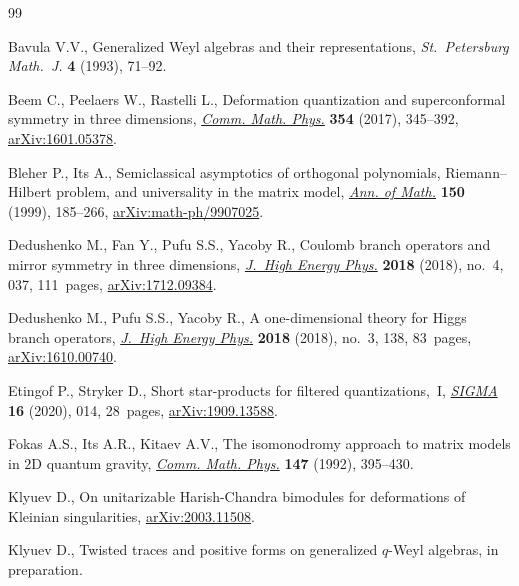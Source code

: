 \documentclass[pdftex]{sigma}
\theoremstyle{definition}
\numberwithin{equation}{section}
\begin{document}
\begin{thebibliography}{99}
\footnotesize\itemsep=0pt

Bavula V.V., Generalized {W}eyl algebras and their representations,
 \textit{St.~Petersburg Math.~J.} \textbf{4} (1993), 71--92.

Beem C., Peelaers W., Rastelli L., Deformation quantization and superconformal
 symmetry in three dimensions, \href{https://doi.org/10.1007/s00220-017-2845-6}{\textit{Comm. Math. Phys.}} \textbf{354} (2017),
 345--392, \href{https://arxiv.org/abs/1601.05378}{arXiv:1601.05378}.

Bleher P., Its A., Semiclassical asymptotics of orthogonal polynomials,
 {R}iemann--{H}ilbert problem, and universality in the matrix model,
 \href{https://doi.org/10.2307/121101}{\textit{Ann. of Math.}} \textbf{150} (1999), 185--266,
 \href{https://arxiv.org/abs/math-ph/9907025}{arXiv:math-ph/9907025}.

Dedushenko M., Fan Y., Pufu S.S., Yacoby R., Coulomb branch operators and
 mirror symmetry in three dimensions, \href{https://doi.org/10.1007/jhep04(2018)037}{\textit{J.~High Energy Phys.}}
 \textbf{2018} (2018), no.~4, 037, 111~pages, \href{https://arxiv.org/abs/1712.09384}{arXiv:1712.09384}.

Dedushenko M., Pufu S.S., Yacoby R., A one-dimensional theory for {H}iggs
 branch operators, \href{https://doi.org/10.1007/jhep03(2018)138}{\textit{J.~High Energy Phys.}} \textbf{2018} (2018), no.~3,
 138, 83~pages, \href{https://arxiv.org/abs/1610.00740}{arXiv:1610.00740}.

Etingof P., Stryker D., Short star-products for filtered quantizations,~{I},
 \href{https://doi.org/10.3842/SIGMA.2020.014}{\textit{SIGMA}} \textbf{16} (2020), 014, 28~pages, \href{https://arxiv.org/abs/1909.13588}{arXiv:1909.13588}.

Fokas A.S., Its A.R., Kitaev A.V., The isomonodromy approach to matrix models
 in {$2$}{D} quantum gravity, \href{https://doi.org/10.1007/BF02096594}{\textit{Comm. Math. Phys.}} \textbf{147} (1992),
 395--430.

Klyuev D., On unitarizable Harish-Chandra bimodules for deformations of
 {K}leinian singularities, \href{https://arxiv.org/abs/2003.11508}{arXiv:2003.11508}.

Klyuev D., Twisted traces and positive forms on generalized $q$-{W}eyl
 algebras, {i}n preparation.


\end{thebibliography}
\end{document}
